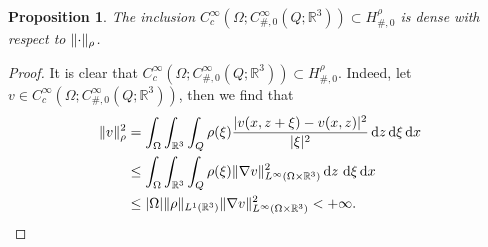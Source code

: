 \documentclass[reqno,11pt]{amsart}
\numberwithin{equation}{section}
\theoremstyle{thmlemcorr}
\numberwithin{theorem}{section}
\newtheorem{proposition}[theorem]{Proposition}
\theoremstyle{thmlemcorr*}
\theoremstyle{defi}
\theoremstyle{remexample}
\theoremstyle{ass}
\newcommand{\N}{\mathbb{N}}
\newcommand{\R}{\mathbb{R}}
\DeclarePairedDelimiter{\abs}{\lvert}{\rvert}
\DeclarePairedDelimiter{\norm}{\lVert}{\rVert}
\newcommand{\1}{\mathds{1}}
\newcommand{\Om}{\Omega}
\newcommand{\dl}{\,\mathrm{d}}
\newcommand{\sequence}[2]{(#1_#2)_{#2}}
\newcommand{\ROSS}[1]{{\textcolor{blue}{$\langle\hspace{-0.3ex}\langle$Ross: #1$\rangle\hspace{-0.3ex}\rangle$}}}
\newcommand{\hidde}[1]{{\textcolor{orange}{$\langle\hspace{-0.3ex}\langle$Hidde: #1$\rangle\hspace{-0.3ex}\rangle$}}}
\begin{document}
\begin{proposition}\label{prop:density}
    The inclusion \(C_c^\infty(\Om;C_{\#,0}^\infty( Q;\R^3))\subset H^\rho_{\#,0}\) is dense with respect to \(\norm{\cdot}_\rho\). 
\end{proposition}
\begin{proof}
    It is clear that \(C_c^\infty(\Om;C_{\#,0}^\infty( Q;\R^3))\subset H^\rho_{\#,0}\). Indeed, let $v \in C_c^\infty(\Om;C_{\#,0}^\infty( Q;\R^3))$, then we find that
     \begin{align*}
         \norm{v}^2_\rho &= \int_{\Om}\int_{\R^3}\int_{Q} \rho(\xi)\frac{|v(x,z+\xi)-v(x,z)|^2}{|\xi|^2} {\dl z\dl \xi\dl x} \\ & \leq \int_{\Om}\int_{\R^3}\int_{Q} \rho(\xi) \norm{\nabla v}^2_{L^{\infty}(\Omega\times\R^3)} \dl z \, \dl \xi\dl x \\ & \leq \abs{\Omega}\norm{\rho}_{L^1(\R^3)} \norm{\nabla v}^2_{L^\infty(\Om \times \R^3)} < + \infty.
     \end{align*}


\end{proof}
\end{document}
